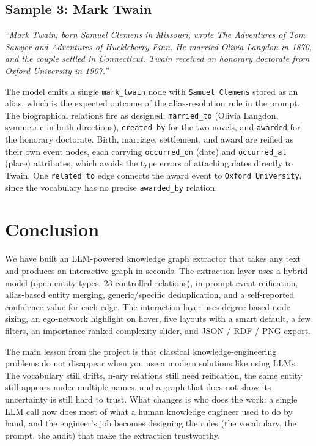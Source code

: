 \documentclass[11pt,a4paper]{article}
\begin{document}
\subsection{Sample 3: Mark Twain}

\emph{``Mark Twain, born Samuel Clemens in Missouri, wrote The Adventures of Tom Sawyer and Adventures of Huckleberry Finn. He married Olivia Langdon in 1870, and the couple settled in Connecticut. Twain received an honorary doctorate from Oxford University in 1907.''}

The model emits a single \texttt{mark\_twain} node with \texttt{Samuel Clemens} stored as an alias, which is the expected outcome of the alias-resolution rule in the prompt. The biographical relations fire as designed: \texttt{married\_to} (Olivia Langdon, symmetric in both directions), \texttt{created\_by} for the two novels, and \texttt{awarded} for the honorary doctorate. Birth, marriage, settlement, and award are reified as their own event nodes, each carrying \texttt{occurred\_on} (date) and \texttt{occurred\_at} (place) attributes, which avoids the type errors of attaching dates directly to Twain. One \texttt{related\_to} edge connects the award event to \texttt{Oxford University}, since the vocabulary has no precise \texttt{awarded\_by} relation.

\section{Conclusion}\label{sec:conclusion}
We have built an LLM-powered knowledge graph extractor that takes any text and produces an interactive graph in seconds. The extraction layer uses a hybrid model (open entity types, 23 controlled relations), in-prompt event reification, alias-based entity merging, generic/specific deduplication, and a self-reported confidence value for each edge. The interaction layer uses degree-based node sizing, an ego-network highlight on hover, five layouts with a smart default, a few filters, an importance-ranked complexity slider, and JSON / RDF / PNG export.

The main lesson from the project is that classical knowledge-engineering problems do not disappear when you use a modern solutions like using LLMs. The vocabulary still drifts, n-ary relations still need reification, the same entity still appears under multiple names, and a graph that does not show its uncertainty is still hard to trust. What changes is who does the work: a single LLM call now does most of what a human knowledge engineer used to do by hand, and the engineer's job becomes designing the rules (the vocabulary, the prompt, the audit) that make the extraction trustworthy.
\end{document}
